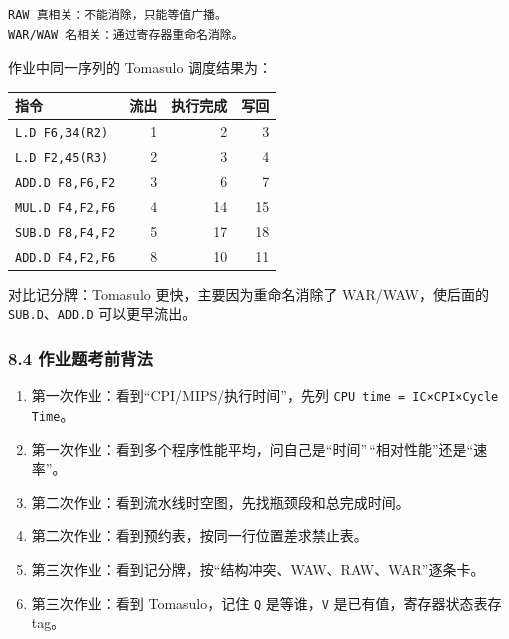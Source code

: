 \documentclass[
]{ctexart}
\newcommand{\passthrough}[1]{#1}
\newcounter{none} %
\providecommand{\tightlist}{%
  \setlength{\itemsep}{0pt}\setlength{\parskip}{0pt}}
\begin{document}
\begin{lstlisting}
RAW 真相关：不能消除，只能等值广播。
WAR/WAW 名相关：通过寄存器重命名消除。
\end{lstlisting}

作业中同一序列的 Tomasulo 调度结果为：

{\def\LTcaptype{none} %
\begin{longtable}[]{@{}lrrr@{}}
\toprule\noalign{}
指令 & 流出 & 执行完成 & 写回 \\
\midrule\noalign{}
\endhead
\bottomrule\noalign{}
\endlastfoot
\passthrough{\lstinline!L.D F6,34(R2)!} & 1 & 2 & 3 \\
\passthrough{\lstinline!L.D F2,45(R3)!} & 2 & 3 & 4 \\
\passthrough{\lstinline!ADD.D F8,F6,F2!} & 3 & 6 & 7 \\
\passthrough{\lstinline!MUL.D F4,F2,F6!} & 4 & 14 & 15 \\
\passthrough{\lstinline!SUB.D F8,F4,F2!} & 5 & 17 & 18 \\
\passthrough{\lstinline!ADD.D F4,F2,F6!} & 8 & 10 & 11 \\
\end{longtable}
}

对比记分牌：Tomasulo 更快，主要因为重命名消除了 WAR/WAW，使后面的
\passthrough{\lstinline!SUB.D!}、\passthrough{\lstinline!ADD.D!}
可以更早流出。

\subsubsection{8.4
作业题考前背法}\label{ux4f5cux4e1aux9898ux8003ux524dux80ccux6cd5}

\begin{enumerate}
\def\labelenumi{\arabic{enumi}.}
\tightlist
\item
  第一次作业：看到``CPI/MIPS/执行时间''，先列
  \passthrough{\lstinline!CPU time = IC×CPI×Cycle Time!}。
\item
  第一次作业：看到多个程序性能平均，问自己是``时间''\,``相对性能''还是``速率''。
\item
  第二次作业：看到流水线时空图，先找瓶颈段和总完成时间。
\item
  第二次作业：看到预约表，按同一行位置差求禁止表。
\item
  第三次作业：看到记分牌，按``结构冲突、WAW、RAW、WAR''逐条卡。
\item
  第三次作业：看到 Tomasulo，记住 \passthrough{\lstinline!Q!}
  是等谁，\passthrough{\lstinline!V!} 是已有值，寄存器状态表存 tag。
\end{enumerate}
\end{document}
